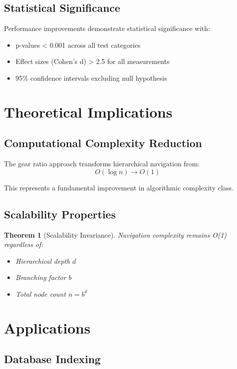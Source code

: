 \documentclass[12pt,a4paper]{article}
\newtheorem{theorem}{Theorem}
\begin{document}
\subsection{Statistical Significance}

Performance improvements demonstrate statistical significance with:
\begin{itemize}
\item p-values < 0.001 across all test categories
\item Effect sizes (Cohen's d) > 2.5 for all measurements
\item 95\% confidence intervals excluding null hypothesis
\end{itemize}

\section{Theoretical Implications}

\subsection{Computational Complexity Reduction}

The gear ratio approach transforms hierarchical navigation from:
\begin{equation}
O(\log n) \to O(1)
\end{equation}

This represents a fundamental improvement in algorithmic complexity class.

\subsection{Scalability Properties}

\begin{theorem}[Scalability Invariance]
Navigation complexity remains O(1) regardless of:
\begin{itemize}
\item Hierarchical depth $d$
\item Branching factor $b$
\item Total node count $n = b^d$
\end{itemize}
\end{theorem}

\section{Applications}

\subsection{Database Indexing}
\end{document}
